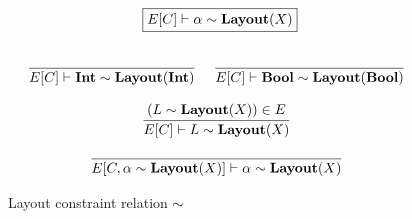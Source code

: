\begin{figure}
  \[
    \begin{array}{c}
      \fbox{$E[C] \vdash \alpha \isA \Layout{X}$}
      \fboxNewlines
      \labinfer{E[C] \vdash \Int \isA \Layout{\Int}}{}
      ~~~
      \labinfer{E[C] \vdash \Bool \isA \Layout{\Bool}}{}
      \\\\
      \labinfer{E[C] \vdash L \isA \Layout{X}}{(L \isA \Layout{X}) \in E}
      \\\\
      \labinfer{E[C, \alpha \isA \Layout{X}] \vdash \alpha \isA \Layout{X}}{}
    \end{array}
  \]
  \caption{Layout constraint relation $\sim$}
  \label{fig:layout-constraints}
\end{figure}


